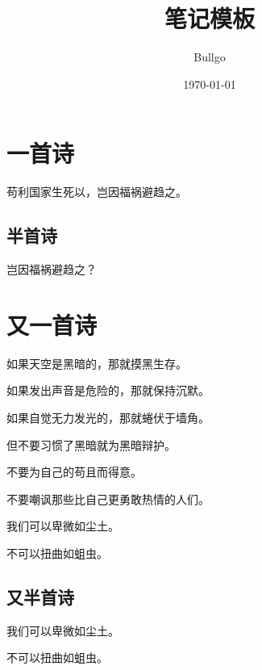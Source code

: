 \documentclass[UTF8]{ctexart}
\title{笔记模板}
\author{Bullgo}
\date{\today}
\begin{document}
    \maketitle

    \tableofcontents    
    \newpage

    \section{一首诗}
    \begin{center}
    苟利国家生死以，岂因福祸避趋之。
    \end{center}

    \subsection{半首诗}
    \begin{center}
    岂因福祸避趋之？
    \end{center}

    \newpage
    \section{又一首诗}
    \begin{center}
    如果天空是黑暗的，那就摸黑生存。

    如果发出声音是危险的，那就保持沉默。

    如果自觉无力发光的，那就蜷伏于墙角。

    但不要习惯了黑暗就为黑暗辩护。

    不要为自己的苟且而得意。

    不要嘲讽那些比自己更勇敢热情的人们。

    我们可以卑微如尘土。

    不可以扭曲如蛆虫。
    \end{center}

    \subsection{又半首诗}
    \begin{center}
    我们可以卑微如尘土。

    不可以扭曲如蛆虫。
    \end{center}



    
\end{document}
